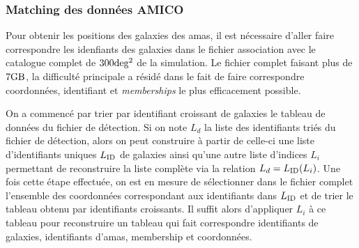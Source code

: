 \documentclass[a4paper,11pt]{article}
\numberwithin{equation}{section}
\begin{document}
      \subsubsection{Matching des données AMICO}
        Pour obtenir les positions des galaxies des amas, il est nécessaire d'aller faire correspondre les idenfiants des galaxies dans le fichier association avec le catalogue complet de $300\rm{deg^2}$ de la simulation. Le fichier complet faisant plus de $7\rm{GB}$, la difficulté principale a résidé dans le fait de faire correspondre coordonnées, identifiant et \textit{memberships} le plus efficacement possible.\par
        On a commencé par trier par identifiant croissant de galaxies le tableau de données du fichier de détection. Si on note $L_d$ la liste des identifiants triés du fichier de détection, alors on peut construire à partir de celle-ci une liste d'identifiants uniques $L_{\rm{ID}}$ de galaxies ainsi qu'une autre liste d'indices $L_i$ permettant de reconstruire la liste complète via la relation $L_d = L_{\rm{ID}} ( L_i)$. Une fois cette étape effectuée, on est en mesure de sélectionner dans le fichier complet l'ensemble des coordonnées correspondant aux identifiants dans $L_{\rm{ID}}$ et de trier le tableau obtenu par identifiants croissants. Il suffit alors d'appliquer $L_i$ à ce tableau pour reconstruire un tableau qui fait correspondre identifiants de galaxies, identifiants d'amas, membership et coordonnées.
\end{document}
